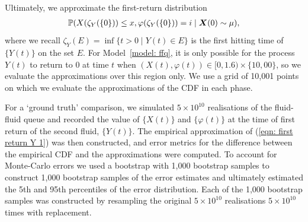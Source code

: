 Ultimately, we approximate the first-return distribution 
\begin{align}\label{eqn: first return Y 1}
	\mathbb P(X(\zeta_{Y}(\{0\}))\leq x, \varphi(\zeta_{Y}(\{0\}))=i\mid \boldsymbol X(0)\sim \mu),
\end{align}
where we recall \(\zeta_{Y}(E) = \inf\{t>0\mid Y(t)\in E\}\) is the first hitting time of \(\{Y(t)\}\) on the set \(E\). For Model~\ref{model: ffq}, it is only possible for the process \(Y(t)\) to return to \(0\) at time \(t\) when \((X(t),\varphi(t))\in[0,1.6)\times \{10,00\}\), so we evaluate the approximations over this region only. We use a grid of 10,001 points on which we evaluate the approximations of the CDF in each phase. 

For a `ground truth' comparison, we simulated \(5\times 10^{10}\) realisations of the fluid-fluid queue and recorded the value of \(\{X(t)\}\) and \(\{\varphi(t)\}\) at the time of first return of the second fluid, \(\{Y(t)\}\). The empirical approximation of (\ref{eqn: first return Y 1}) was then constructed, and error metrics for the difference between the empirical CDF and the approximations were computed. To account for Monte-Carlo errors we used a bootstrap with 1,000 bootstrap samples to construct 1,000 bootstrap samples of the error estimates and ultimately estimated the 5th and 95th percentiles of the error distribution. Each of the 1,000 bootstrap samples was constructed by resampling the original \(5\times 10^{10}\) realisations \(5\times 10^{10}\) times with replacement.


